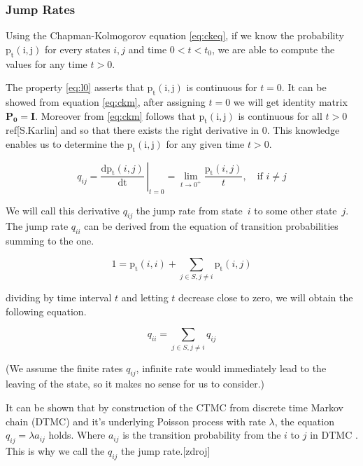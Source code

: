 \documentclass[thesis=M,english]{FITthesis}[2012/10/20]
\newcommand{\matr}[1]{\mathbf{#1}}
\begin{document}
  




\subsubsection{ Jump Rates }

Using the Chapman-Kolmogorov equation \eqref{eq:ckeq}, if we know the probability $\mathrm{p_t(i,j)}$ for every states $i,j$ and time $0 < t < t_0$, we are able to compute the values for any time $t > 0$. 

The property \eqref{eq:l0}  asserts that $\mathrm{p_t(i,j)}$ is continuous for $t=0$. It can be showed from equation \eqref{eq:ckm}, after assigning $t=0$ we will get identity matrix $\matr{P_0} = \matr{I}$.
Moreover from \eqref{eq:ckm} follows that $\mathrm{p_t(i,j)}$ is continuous for all $t>0$ ref[S.Karlin] and so that there exists the right derivative in 0. This knowledge enables us to determine the $\mathrm{p_t(i,j)}$ for any given time $t>0$.   

\begin{equation}
q_{ij} =  \left.\frac{\mathrm{d}\mathrm{p_t}(i,j)}{\mathrm{dt}} \,\right|_{t=0} = \lim_{t \to 0^+} \frac{\mathrm{p_t}(i,j)}{t}, \quad \text{if } i\neq j     
\end{equation}

We will call this derivative $q_{ij}$ the jump rate from state~$i$ to some other state~$j$. The jump rate $q_{ii}$ can be derived from the equation of transition probabilities summing to the one.

\begin{equation}
1 = \mathrm{p_t}(i,i) + \sum_{j \in S ,j \neq i} \mathrm{p_t}(i,j) 
\end{equation}

dividing by time interval $t$ and letting $t$ decrease close to zero, we will obtain the following equation. 

\begin{equation}\label{eq:qii}
 q_{ii} =  \sum_{j \in S ,j \neq i} q_{ij} 
\end{equation}

(We assume the finite rates $q_{ij}$, infinite rate would immediately lead to the leaving of the state, so it makes no sense for us to consider.)

It can be shown that by construction of the CTMC from discrete time Markov chain (DTMC) and  it's underlying Poisson process with rate $\lambda$, the equation $q_{ij} = \lambda a_{ij}$ holds. Where $a_{ij}$ is the transition probability from the $i$ to $j$ in DTMC \label{eq:tp}. This is why we call the $q_{ij}$ the jump rate.[zdroj]  
\end{document}
